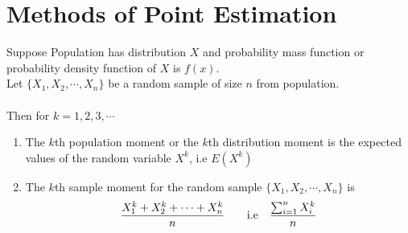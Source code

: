 \documentclass[11pt,oneside]{book}
\theoremstyle{newStyle}
\begin{document}
\section[Methods of Point Estimation]{Methods of Point Estimation}
Suppose Population has distribution $X$ and probability mass function or probability density function of $X$ is $f(x)$.\\
Let $\{X_1,X_2,\cdots,X_n\}$ be a random sample of size $n$ from population.\\
\hfill\\
Then for $k=1,2,3,\cdots$\begin{enumerate}
\item The $k$th population moment or the $k$th distribution moment is the expected values of the random variable $X^k$, i.e $E(X^k)$
\item The $k$th sample moment for the random sample $\{X_1,X_2,\cdots,X_n\}$ is \begin{align*}
\frac{X_1^k+X_2^k+\cdots+X_n^k}{n} \text{\qquad i.e\quad}\frac{\sum_{i=1}^nX_i^k}{n}
\end{align*}
\end{enumerate}
\end{document}
